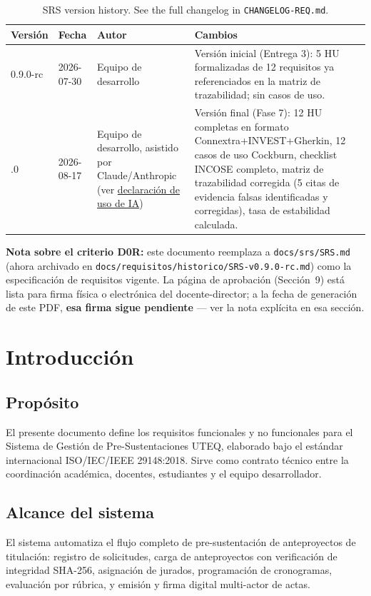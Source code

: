 \documentclass[11pt,a4paper]{article}
\begin{document}
\begin{table}[H]
\centering
\small
\begin{tabular}{p{1.5cm} p{1.7cm} p{3.2cm} p{7.5cm}}
\toprule
\textbf{Versión} & \textbf{Fecha} & \textbf{Autor} & \textbf{Cambios} \\
\midrule
0.9.0-rc & 2026-07-30 & Equipo de desarrollo & Versión inicial (Entrega 3): 5 HU formalizadas de 12 requisitos ya referenciados en la matriz de trazabilidad; sin casos de uso. \\
\addlinespace
1.0.0 & 2026-08-17 & Equipo de desarrollo, asistido por Claude/Anthropic (ver \href{../etica/ai-disclosure.md}{declaración de uso de IA}) & Versión final (Fase 7): 12 HU completas en formato Connextra+INVEST+Gherkin, 12 casos de uso Cockburn, checklist INCOSE completo, matriz de trazabilidad corregida (5 citas de evidencia falsas identificadas y corregidas), tasa de estabilidad calculada. \\
\bottomrule
\end{tabular}
\caption{SRS version history. See the full changelog in \texttt{CHANGELOG-REQ.md}.}
\end{table}

\textbf{Nota sobre el criterio D0R:} este documento reemplaza a \texttt{docs/srs/SRS.md} (ahora archivado
en \texttt{docs/requisitos/historico/SRS-v0.9.0-rc.md}) como la especificación de requisitos vigente. La
página de aprobación (Sección~9) está lista para firma física o electrónica del docente-director; a la
fecha de generación de este PDF, \textbf{esa firma sigue pendiente} — ver la nota explícita en esa
sección.

\section{Introducción}

\subsection{Propósito}
El presente documento define los requisitos funcionales y no funcionales para el Sistema de Gestión de
Pre-Sustentaciones UTEQ, elaborado bajo el estándar internacional ISO/IEC/IEEE 29148:2018. Sirve como
contrato técnico entre la coordinación académica, docentes, estudiantes y el equipo desarrollador.

\subsection{Alcance del sistema}
El sistema automatiza el flujo completo de pre-sustentación de anteproyectos de titulación: registro de
solicitudes, carga de anteproyectos con verificación de integridad SHA-256, asignación de jurados,
programación de cronogramas, evaluación por rúbrica, y emisión y firma digital multi-actor de actas.
\end{document}
